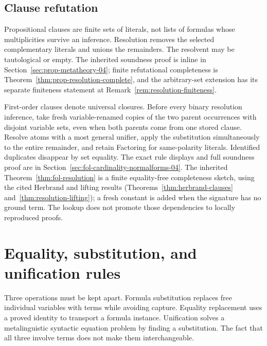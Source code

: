 
\subsection{Clause refutation}

Propositional clauses are finite sets of literals, not lists of formulas
whose multiplicities survive an inference.  Resolution removes the selected
complementary literals and unions the remainders.  The resolvent may be
tautological or empty.  The inherited soundness proof is inline in
Section~\ref{sec:prop-metatheory-04}; finite refutational completeness is
Theorem~\ref{thm:prop-resolution-complete}, and the arbitrary-set extension
has its separate finiteness statement at
Remark~\ref{rem:resolution-finiteness}.


First-order clauses denote universal closures.  Before every binary
resolution inference, take fresh variable-renamed copies of the two parent
occurrences with disjoint variable sets, even when both parents come from
one stored clause.  Resolve atoms with a most general unifier, apply the
substitution simultaneously to the entire remainder, and retain Factoring
for same-polarity literals.  Identified duplicates disappear by set equality.
The exact rule displays and full soundness proof are in
Section~\ref{sec:fol-cardinality-normalforms-04}.  The inherited
Theorem~\ref{thm:fol-resolution} is a finite equality-free completeness
sketch, using the cited Herbrand and lifting results
(Theorems~\ref{thm:herbrand-clauses} and~\ref{thm:resolution-lifting}); a
fresh constant is added when the signature has no ground term.  The lookup
does not promote those dependencies to locally reproduced proofs.


\section{Equality, substitution, and unification rules}
\label{sec:p14-classical-calculi-equality}

Three operations must be kept apart.  Formula substitution replaces free
individual variables with terms while avoiding capture.  Equality
replacement uses a proved identity to transport a formula instance.
Unification solves a metalinguistic syntactic equation problem by finding
a substitution.  The fact that all three involve terms does not make them
interchangeable.

